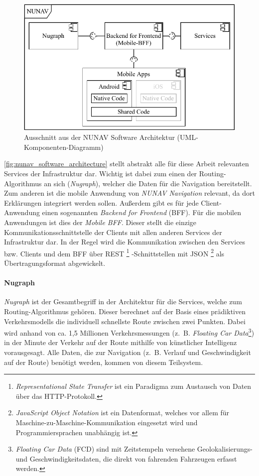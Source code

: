 \begin{figure}[htb!]
    \centering
    \includegraphics[width=\textwidth]{contents/06_model_evaluation/01_integration/res/nunav_architecture.pdf}
    \caption{Ausschnitt aus der NUNAV Software Architektur (UML-Komponenten-Diagramm)}
    \label{fig:nunav_software_architecture}
\end{figure}

\autoref{fig:nunav_software_architecture} stellt abstrakt alle für diese Arbeit relevanten Services der Infrastruktur dar. Wichtig ist dabei zum einen der Routing-Algorithmus an sich (\textit{Nugraph}), welcher die Daten für die Navigation bereitstellt. Zum anderen ist die mobile Anwendung von \textit{NUNAV Navigation} relevant, da dort Erklärungen integriert werden sollen. Außerdem gibt es für jede Client-Anwendung einen sogenannten \textit{Backend for Frontend} (BFF). Für die mobilen Anwendungen ist dies der \textit{Mobile BFF}. Dieser stellt die einzige Kommunikationsschnittstelle der Clients mit allen anderen Services der Infrastruktur dar. In der Regel wird die Kommunikation zwischen den Services bzw. Clients und dem BFF über REST
\footnote{\textit{Representational State Transfer} ist ein Paradigma zum Austausch von Daten über das HTTP-Protokoll.}
-Schnittstellen mit JSON
\footnote{\textit{JavaScript Object Notation} ist ein Datenformat, welches vor allem für Maschine-zu-Maschine-Kommunikation eingesetzt wird und Programmiersprachen unabhängig ist.}
als Übertragungsformat abgewickelt. 

\paragraph{Nugraph} \textit{Nugraph} ist der Gesamtbegriff in der Architektur für die Services, welche zum Routing-Algorithmus gehören. Dieser berechnet auf der Basis eines prädiktiven Verkehrsmodells die individuell schnellste Route zwischen zwei Punkten. Dabei wird anhand von ca. 1,5 Millionen Verkehrsmessungen
 (z.~B. \textit{Floating Car Data}\footnote{\textit{Floating Car Data} (FCD) sind mit Zeitstempeln versehene Geolokalisierungs- und Geschwindigkeitsdaten, die direkt von fahrenden Fahrzeugen erfasst werden.})
 in der Minute der Verkehr auf der Route mithilfe von künstlicher Intelligenz vorausgesagt. Alle Daten, die zur Navigation (z.~B. Verlauf und Geschwindigkeit auf der Route) benötigt werden, kommen von diesem Teilsystem.

